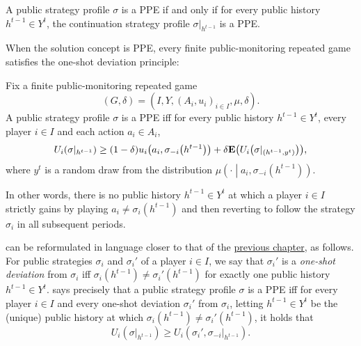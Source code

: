 \begin{observation}
	\label{observation:ppe_conts}
	A public strategy profile $\sigma$ is a PPE if and only if for every public history $h^{t-1} \in Y^t$, the continuation strategy profile $\sigma|_{h^{t-1}}$ is a PPE.
\end{observation}

When the solution concept is PPE, every finite public-monitoring repeated game satisfies the one-shot deviation principle:

\begin{proposition}
	\label{proposition:ppe_osdp}
	Fix a finite public-monitoring repeated game
	\begin{equation*}
		(G,\delta) = \left( I, Y, (A_i, u_i)_{i \in I}, \mu, \delta \right) .
	\end{equation*}
	A public strategy profile $\sigma$ is a PPE iff for every public history $h^{t-1} \in Y^t$, every player $i \in I$ and each action $a_i \in A_i$,
	\begin{equation*}
		U_i\left( \sigma|_{h^{t-1}} \right)
		\geq (1-\delta) u_i\left( a_i, \sigma_{-i}\left( h^{t-1} \right) \right)
		+ \delta \E\left( U_i\left( \sigma|_{\left(h^{t-1},y^t\right)} \right) \right) ,
	\end{equation*}
	where $y^t$ is a random draw from the distribution $\mu\left( \cdot \middle| a_i, \sigma_{-i}\left( h^{t-1} \right) \right)$.
\end{proposition}

In other words, there is no public history $h^{t-1} \in Y^t$ at which a player $i \in I$ strictly gains by playing $a_i \neq \sigma_i\left( h^{t-1} \right)$ and then reverting to follow the strategy $\sigma_i$ in all subsequent periods.

 can be reformulated in language closer to that of the \hyperref[ch_osdp]{previous chapter}, as follows. For public strategies $\sigma_i$ and $\sigma_i'$ of a player $i \in I$, we say that $\sigma_i'$ is a \emph{one-shot deviation} from $\sigma_i$ iff $\sigma_i\left( h^{t-1} \right) \neq \sigma_i'\left( h^{t-1} \right)$ for exactly one public history $h^{t-1} \in Y^t$.  says precisely that a public strategy profile $\sigma$ is a PPE iff for every player $i \in I$ and every one-shot deviation $\sigma_i'$ from $\sigma_i$, letting $h^{t-1} \in Y^t$ be the (unique) public history at which $\sigma_i\left( h^{t-1} \right) \neq \sigma_i'\left( h^{t-1} \right)$, it holds that
%
\begin{equation*}
	U_i\left( \sigma|_{h^{t-1}} \right)
	\geq U_i\left( \sigma_i', \sigma_{-i}|_{h^{t-1}} \right) .
\end{equation*}

